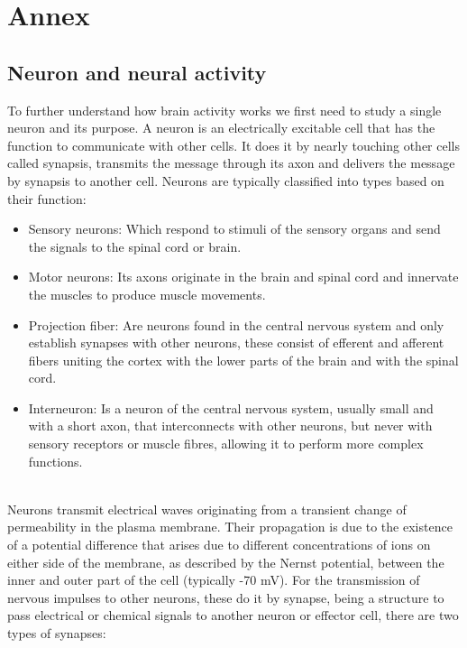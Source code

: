 \section{Annex}
\label{sec-annex}

\subsection{Neuron and neural activity}
\label{subsec-neuron}

To further understand how brain activity works we first need to study a single neuron and its purpose. A neuron is an electrically excitable cell that has the function to communicate with other cells. It does it by nearly touching other cells called synapsis, transmits the message through its axon and delivers the message by synapsis\cite{Synapse} to another cell. Neurons are typically classified into types based on their function:
\\
\begin{itemize}
  \item Sensory neurons\cite{Sensoryneuron}: Which respond to stimuli of the sensory organs and send the signals to the spinal cord or brain.
  \item Motor neurons\cite{Motorneuron}: Its axons originate in the brain and spinal cord and innervate the muscles to produce muscle movements.
  \item Projection fiber\cite{Projectionfiber}: Are neurons found in the central nervous system and only establish synapses with other neurons, these consist of efferent and afferent fibers uniting the cortex with the lower parts of the brain and with the spinal cord.
  \item Interneuron\cite{Interneuron}: Is a neuron of the central nervous system, usually small and with a short axon, that interconnects with other neurons, but never with sensory receptors or muscle fibres, allowing it to perform more complex functions.
\end{itemize}
\leavevmode\\
Neurons transmit electrical waves originating from a transient change of permeability in the plasma membrane. Their propagation is due to the existence of a potential difference that arises due to different concentrations of ions on either side of the membrane, as described by the Nernst potential, between the inner and outer part of the cell (typically -70 mV). For the transmission of nervous impulses to other neurons, these do it by synapse, being a structure to pass electrical or chemical signals to another neuron or effector cell, there are two types of synapses\cite{Synapse}:
